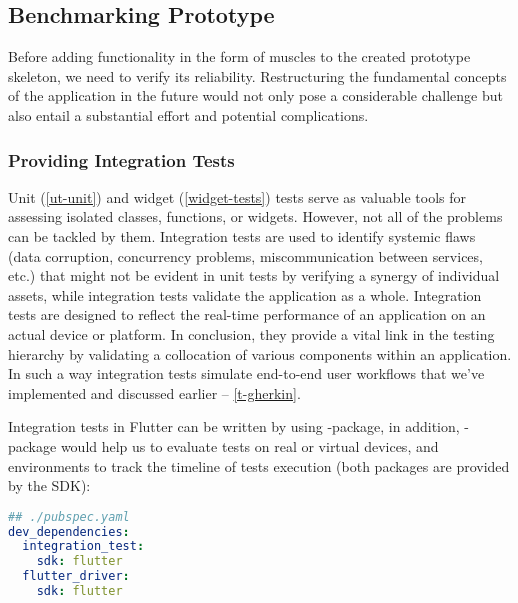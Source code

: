 
\subsection{Benchmarking Prototype} \label{benchmark}

Before adding functionality in the form of muscles to the created prototype skeleton, we need to verify its reliability.
Restructuring the fundamental concepts of the application in the future would not only pose a considerable challenge 
but also entail a substantial effort and potential complications.


\subsubsection{Providing Integration Tests} \label{int-tests}

Unit (\ref{ut-unit}) and widget (\ref{widget-tests}) tests serve as valuable tools for assessing isolated classes, 
functions, or widgets. However, not all of the problems can be tackled by them. Integration tests are used to identify 
systemic flaws (data corruption, concurrency problems, miscommunication between services, etc.) that might not be 
evident in unit tests by verifying a synergy of individual assets, while integration tests validate the application as 
a whole. Integration tests are designed to reflect the real-time performance of an application on an actual device or 
platform. In conclusion, they provide a vital link in the testing hierarchy by validating a collocation of various 
components within an application. In such a way integration tests simulate end-to-end user workflows that we've 
implemented and discussed earlier -- \ref{t-gherkin}.

Integration tests in Flutter can be written by using -package, in addition, 
-package would help us to evaluate tests on real or virtual devices, and environments to track 
the timeline of tests execution (both packages are provided by the SDK):

\begin{lstlisting}[language=yaml]
## ./pubspec.yaml
dev_dependencies:
  integration_test:
    sdk: flutter
  flutter_driver: 
    sdk: flutter
\end{lstlisting}

